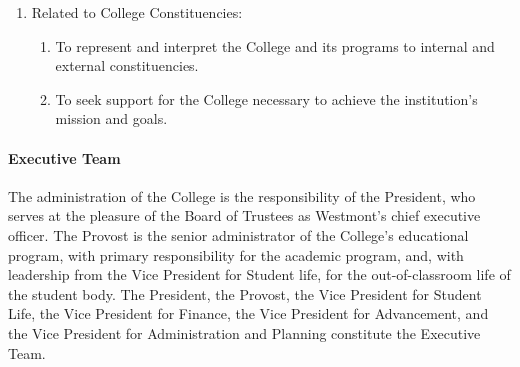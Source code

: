 \documentclass[letterpaper, 11pt]{article}
\begin{document}
\begin{enumerate}
{\begin{enumerate}
{\begin{enumerate}
{\begin{enumerate}
										\item{To provide vision and leadership for the faculty and administration in formulating educational and support programs.}
										\item{To oversee the operation and development of the institution as a whole.}
										\item{To supervise the Vice Presidents in the performance of their duties.}
										\item{To make final review and give final administrative approval of College plans, budgets, and policies and to submit appropriate items to the Board of Trustees for adoption.}
									\end{enumerate}
								}
								\item{Related to College Constituencies:
									\begin{enumerate}
										\item{To represent and interpret the College and its programs to internal and external constituencies.}
										\item{To seek support for the College necessary to achieve the institution's mission and goals.}
									\end{enumerate}
								}
							\end{enumerate}
						}
					\end{enumerate}
					}
			\end{enumerate}
			\paragraph{Executive Team}

				The administration of the College is the responsibility of the President, who serves at the pleasure of the Board of Trustees as Westmont's chief executive officer.  The Provost is the senior administrator of the College's educational program, with primary responsibility for the academic program, and, with leadership from the Vice President for Student life, for the out-of-classroom life of the student body.  The President, the Provost, the Vice President for Student Life, the Vice President for Finance, the Vice President for Advancement, and the Vice President for Administration and Planning constitute the Executive Team.
\end{document}
